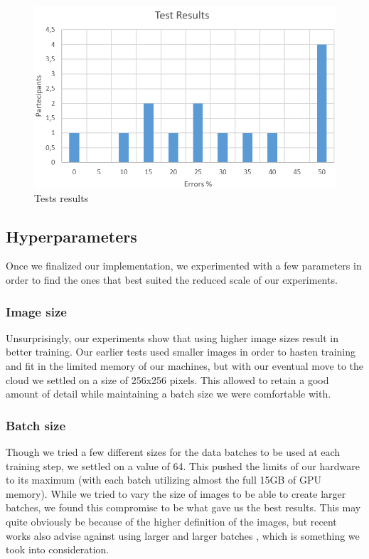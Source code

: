 \documentclass[twoside,twocolumn]{article}
\begin{document}
\begin{figure}
	\includegraphics[width=\linewidth]{img/graficotest.png}
	\caption{Tests results}
	\label{fig:testres}
\end{figure}

\subsection{Hyperparameters}

Once we finalized our implementation, we experimented with a few parameters in order to find the ones that best suited the reduced scale of our experiments.

\subsubsection{Image size}
Unsurprisingly, our experiments show that using higher image sizes result in better training. Our earlier tests used smaller images in order to hasten training and fit in the limited memory of our machines, but with our eventual move to the cloud we settled on a size of 256x256 pixels. This allowed to retain a good amount of detail while maintaining a batch size we were comfortable with.

\subsubsection{Batch size}
Though we tried a few different sizes for the data batches to be used at each training step, we settled on a value of 64. This pushed the limits of our hardware to its maximum (with each batch utilizing almost the full 15GB of GPU memory). While we tried to vary the size of images to be able to create larger batches, we found this compromise to be what gave us the best results. This may quite obviously be because of the higher definition of the images, but recent works also advise against using larger and larger batches \cite{Nitish:2017}, which is something we took into consideration.
\end{document}
